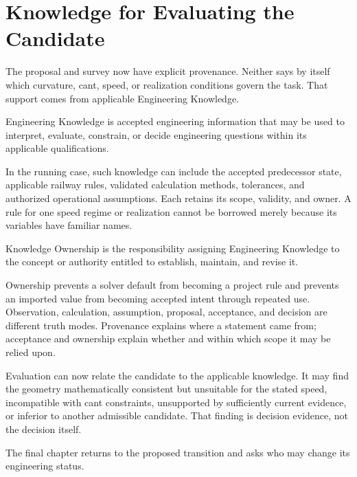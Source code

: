 
\chapter{Knowledge for Evaluating the Candidate}
\label{chap:engineering-knowledge}

The proposal and survey now have explicit provenance. Neither says by itself
which curvature, cant, speed, or realization conditions govern the task. That
support comes from applicable Engineering Knowledge.

\begin{definition}
\label{def:engineering-knowledge}
Engineering Knowledge is accepted engineering information that may be used to
interpret, evaluate, constrain, or decide engineering questions within its
applicable qualifications.
\end{definition}

In the running case, such knowledge can include the accepted predecessor
state, applicable railway rules, validated calculation methods, tolerances,
and authorized operational assumptions. Each retains its scope, validity, and
owner. A rule for one speed regime or realization cannot be borrowed merely
because its variables have familiar names.

\begin{definition}
\label{def:knowledge-ownership}
Knowledge Ownership is the responsibility assigning Engineering Knowledge to
the concept or authority entitled to establish, maintain, and revise it.
\end{definition}

Ownership prevents a solver default from becoming a project rule and prevents
an imported value from becoming accepted intent through repeated use.
Observation, calculation, assumption, proposal, acceptance, and decision are
different truth modes. Provenance explains where a statement came from;
acceptance and ownership explain whether and within which scope it may be
relied upon.

Evaluation can now relate the candidate to the applicable knowledge. It may
find the geometry mathematically consistent but unsuitable for the stated
speed, incompatible with cant constraints, unsupported by sufficiently current
evidence, or inferior to another admissible candidate. That finding is
decision evidence, not the decision itself.

The final chapter returns to the proposed transition and asks who may change
its engineering status.
